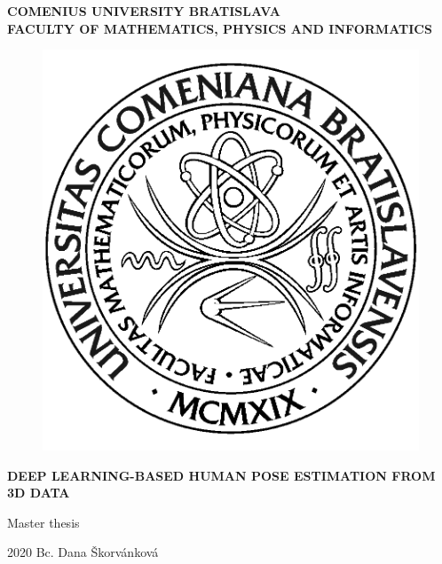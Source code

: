 \documentclass[12pt, a4paper, oneside]{book}
\newcommand\mftitle{Deep Learning-based Human Pose Estimation from 3D Data}
\newcommand\mfthesistype{Master thesis}
\newcommand\mfauthor{Bc. Dana Škorvánková}
\newcommand\mfuniversity{COMENIUS UNIVERSITY BRATISLAVA}
\newcommand\mffaculty{FACULTY OF MATHEMATICS, PHYSICS AND INFORMATICS}
\begin{document}
\frontmatter

\thispagestyle{empty}

\noindent
\begin{minipage}{\textwidth}
\begin{center}
\textbf{\mfuniversity \\
\mffaculty}
\end{center}
\end{minipage}

\vfill
\begin{figure}[!hbt]
	\begin{center}
		\includegraphics{images/logo_fmph}
		\label{img:logo}
	\end{center}
\end{figure}
\begin{center}
	\begin{minipage}{0.8\textwidth}
		\begin{center}\textbf{\Large\MakeUppercase{\mftitle}}\end{center}
		\smallskip
		\centerline{\mfthesistype}
	\end{minipage}
\end{center}
\vfill
2020 \hfill
\mfauthor
\eject 

\thispagestyle{empty}
\end{document}
